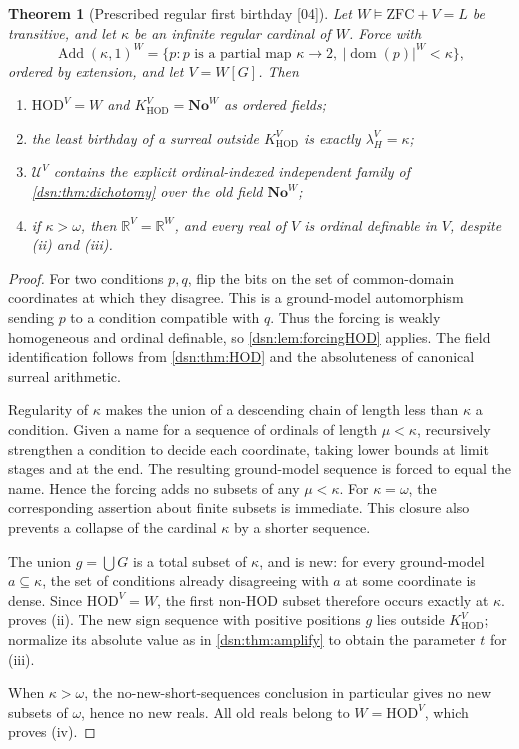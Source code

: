 \documentclass[11pt,a4paper]{article}
\numberwithin{equation}{section}
\newtheorem{theorem}{Theorem}[section]
\theoremstyle{definition}
\theoremstyle{remark}
\newcommand{\No}{\mathbf{No}}
\newcommand{\HOD}{\mathrm{HOD}}
\newcommand{\ZFC}{\mathrm{ZFC}}
\newcommand{\R}{\mathbb R}
\newcommand{\dom}{\operatorname{dom}}
\newcommand{\Cell}{\mathcal U}
\newcommand{\KH}{K_{\HOD}}
\newcommand{\src}[1]{\textup{\textsf{\small[#1]}}}
\begin{document}
\begin{theorem}[Prescribed regular first birthday \src{04}]\label{dsn:thm:forcing}
Let $W\models\ZFC+V=L$ be transitive, and let $\kappa$ be an
infinite regular cardinal of $W$. Force with
\[
 \operatorname{Add}(\kappa,1)^W
 =\{p:p\text{ is a partial map }\kappa\to2,
                    \ |\dom(p)|^W<\kappa\},
\]
ordered by extension, and let $V=W[G]$. Then
\begin{enumerate}[label=\textup{(\roman*)}]
\item $\HOD^V=W$ and $\KH^V=\No^W$ as ordered fields;
\item the least birthday of a surreal outside $\KH^V$ is exactly
$\lambda_H^V=\kappa$;
\item $\Cell^V$ contains the explicit ordinal-indexed independent
family of \cref{dsn:thm:dichotomy} over the old field $\No^W$;
\item if $\kappa>\omega$, then $\R^V=\R^W$, and every real of $V$
is ordinal definable in $V$, despite \textup{(ii)} and \textup{(iii)}.
\end{enumerate}
\end{theorem}
\begin{proof}
For two conditions $p,q$, flip the bits on the set of common-domain
coordinates at which they disagree. This is a ground-model
automorphism sending $p$ to a condition compatible with $q$.
Thus the forcing is weakly homogeneous and ordinal definable, so
\cref{dsn:lem:forcingHOD} applies. The field identification follows
from \cref{dsn:thm:HOD} and the absoluteness of canonical surreal
arithmetic.

Regularity of $\kappa$ makes the union of a descending chain of
length less than $\kappa$ a condition. Given a name for a sequence
of ordinals of length $\mu<\kappa$, recursively strengthen a
condition to decide each coordinate, taking lower bounds at limit
stages and at the end. The resulting ground-model sequence is
forced to equal the name. Hence the forcing adds no subsets of any
$\mu<\kappa$. For $\kappa=\omega$, the corresponding assertion
about finite subsets is immediate. This closure also prevents a
collapse of the cardinal $\kappa$ by a shorter sequence.

The union $g=\bigcup G$ is a total subset of $\kappa$, and is new:
for every ground-model $a\subseteq\kappa$, the set of conditions
already disagreeing with $a$ at some coordinate is dense. Since
$\HOD^V=W$, the first non-$\HOD$ subset therefore occurs exactly at
$\kappa$.  proves (ii).
The new sign sequence with positive positions $g$ lies outside
$\KH^V$; normalize its absolute value as in
\cref{dsn:thm:amplify} to obtain the parameter $t$ for (iii).

When $\kappa>\omega$, the no-new-short-sequences conclusion in
particular gives no new subsets of $\omega$, hence no new reals.
All old reals belong to $W=\HOD^V$, which proves (iv).
\end{proof}
\end{document}
